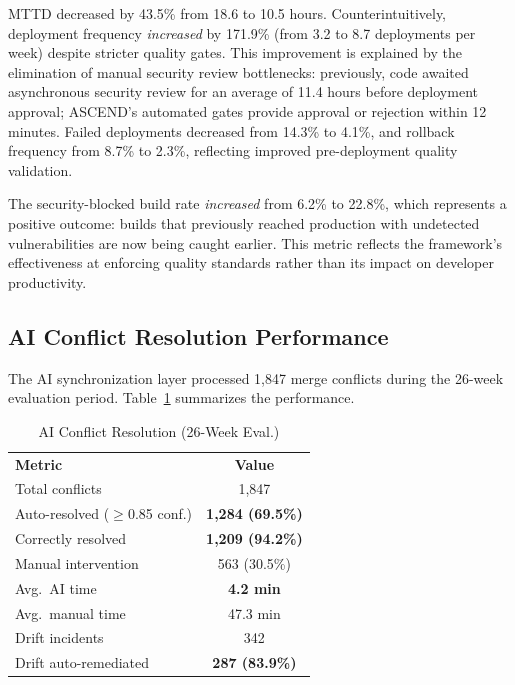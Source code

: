 \documentclass[journal]{IEEEtran}
\begin{document}
MTTD decreased by 43.5\% from 18.6 to 10.5 hours. Counterintuitively, deployment frequency \textit{increased} by 171.9\% (from 3.2 to 8.7 deployments per week) despite stricter quality gates. This improvement is explained by the elimination of manual security review bottlenecks: previously, code awaited asynchronous security review for an average of 11.4 hours before deployment approval; ASCEND's automated gates provide approval or rejection within 12 minutes. Failed deployments decreased from 14.3\% to 4.1\%, and rollback frequency from 8.7\% to 2.3\%, reflecting improved pre-deployment quality validation.

The security-blocked build rate \textit{increased} from 6.2\% to 22.8\%, which represents a positive outcome: builds that previously reached production with undetected vulnerabilities are now being caught earlier. This metric reflects the framework's effectiveness at enforcing quality standards rather than its impact on developer productivity.

\subsection{AI Conflict Resolution Performance}

The AI synchronization layer processed 1,847 merge conflicts during the 26-week evaluation period. Table~\ref{tab:ai} summarizes the performance.

\begin{table}[h]
\centering
\caption{AI Conflict Resolution (26-Week Eval.)}
\label{tab:ai}
\scriptsize
\begin{tabular}{@{}lc@{}}
\rowcolor{TableHeader}\color{white}\textbf{Metric} & \color{white}\textbf{Value} \\
\rowcolor{TableAlt}Total conflicts & 1,847 \\
\rowcolor{IEEELightPurple}Auto-resolved ($\geq$0.85 conf.) & \textbf{1,284 (69.5\%)} \\
\rowcolor{TableAlt}Correctly resolved & \textbf{1,209 (94.2\%)} \\
\rowcolor{white}Manual intervention & 563 (30.5\%) \\
\rowcolor{TableAlt}Avg.\ AI time & \textbf{4.2 min} \\
\rowcolor{white}Avg.\ manual time & 47.3 min \\
\rowcolor{TableAlt}Drift incidents & 342 \\
\rowcolor{IEEELightGreen}Drift auto-remediated & \textbf{287 (83.9\%)} \\
\end{tabular}
\end{table}
\end{document}
